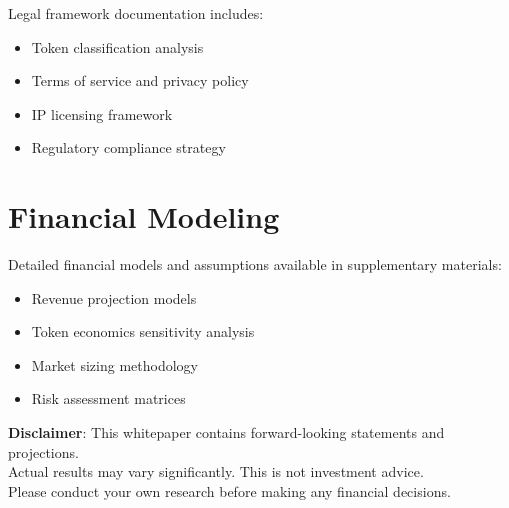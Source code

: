 \documentclass[12pt,a4paper]{article}
\begin{document}
Legal framework documentation includes:

\begin{itemize}
    \item Token classification analysis
    \item Terms of service and privacy policy
    \item IP licensing framework
    \item Regulatory compliance strategy
\end{itemize}

\section{Financial Modeling}
\label{appendix:financial}

Detailed financial models and assumptions available in supplementary materials:

\begin{itemize}
    \item Revenue projection models
    \item Token economics sensitivity analysis
    \item Market sizing methodology
    \item Risk assessment matrices
\end{itemize}

\vfill
\begin{center}
\textcolor{storygray}{\small
\textbf{Disclaimer}: This whitepaper contains forward-looking statements and projections. \\
Actual results may vary significantly. This is not investment advice. \\
Please conduct your own research before making any financial decisions.
}
\end{center}
\end{document}
